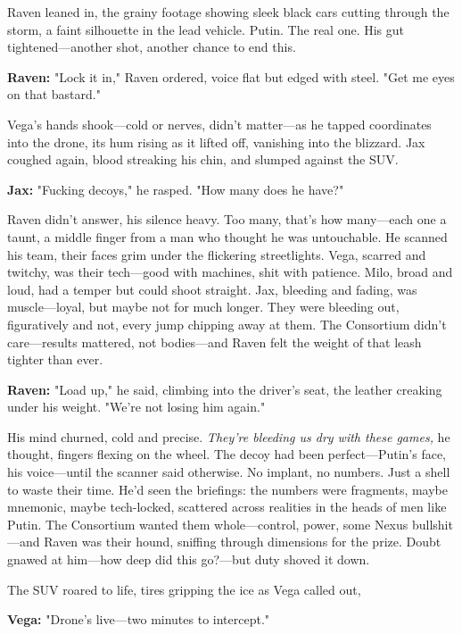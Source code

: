 \documentclass[12pt]{book}
\begin{document}
Raven leaned in, the grainy footage showing sleek black cars cutting through the storm, a faint silhouette in the lead vehicle. Putin. The real one. His gut tightened—another shot, another chance to end this.

\vspace{0.5em}
\textbf{Raven:} "Lock it in," Raven ordered, voice flat but edged with steel. "Get me eyes on that bastard."

Vega’s hands shook—cold or nerves, didn’t matter—as he tapped coordinates into the drone, its hum rising as it lifted off, vanishing into the blizzard. Jax coughed again, blood streaking his chin, and slumped against the SUV.

\vspace{0.5em}
\textbf{Jax:} "Fucking decoys," he rasped. "How many does he have?"

Raven didn’t answer, his silence heavy. Too many, that’s how many—each one a taunt, a middle finger from a man who thought he was untouchable. He scanned his team, their faces grim under the flickering streetlights. Vega, scarred and twitchy, was their tech—good with machines, shit with patience. Milo, broad and loud, had a temper but could shoot straight. Jax, bleeding and fading, was muscle—loyal, but maybe not for much longer. They were bleeding out, figuratively and not, every jump chipping away at them. The Consortium didn’t care—results mattered, not bodies—and Raven felt the weight of that leash tighter than ever.

\vspace{0.5em}
\textbf{Raven:} "Load up," he said, climbing into the driver’s seat, the leather creaking under his weight. "We’re not losing him again."

His mind churned, cold and precise. \textit{They’re bleeding us dry with these games,} he thought, fingers flexing on the wheel. The decoy had been perfect—Putin’s face, his voice—until the scanner said otherwise. No implant, no numbers. Just a shell to waste their time. He’d seen the briefings: the numbers were fragments, maybe mnemonic, maybe tech-locked, scattered across realities in the heads of men like Putin. The Consortium wanted them whole—control, power, some Nexus bullshit—and Raven was their hound, sniffing through dimensions for the prize. Doubt gnawed at him—how deep did this go?—but duty shoved it down.

The SUV roared to life, tires gripping the ice as Vega called out,

\vspace{0.5em}
\textbf{Vega:} "Drone’s live—two minutes to intercept."
\end{document}
